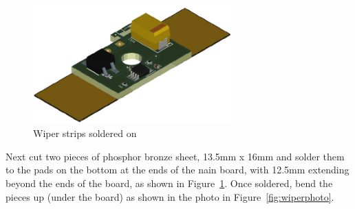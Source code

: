 \documentclass[12pt,twoside,letterpaper]{article}
\begin{document}
\begin{figure}[hbpt]\begin{centering}%
\includegraphics[width=3in]{FRED_with_wipers_not_bent.png}
\caption{Wiper strips soldered on}
\label{fig:FRED_with_wipers_not_bent}
\end{centering}\end{figure}
Next cut two pieces of phosphor bronze sheet, 13.5mm x 16mm and solder them to
the pads on the bottom at the ends of the nain board, with 12.5mm extending
beyond the ends of the board, as shown in
Figure~\ref{fig:FRED_with_wipers_not_bent}. Once soldered, bend the pieces up
(under the board) as shown in the photo in Figure~\ref{fig:wiperphoto}.
\end{document}
